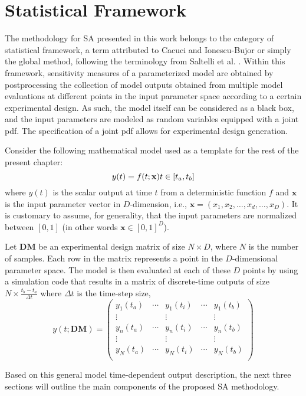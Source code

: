 \section{Statistical Framework}\label{sec:sa_statistical_framework}

The methodology for SA presented in this work belongs to
the category of statistical framework, a term attributed
to Cacuci and Ionescu-Bujor \cite{Ionescu-Bujor2004} or simply the global
method, following the terminology from Saltelli et al. \cite{Saltelli2004}.
Within this framework, sensitivity measures of a parameterized
model are obtained by postprocessing the collection
of model outputs obtained from multiple model
evaluations at different points in the input parameter space
according to a certain experimental design. 
As such, the model itself can be considered as a black box, 
and the input parameters are modeled as random variables
equipped with a joint pdf. 
The specification of a joint pdf allows for experimental design generation.

Consider the following mathematical model used as a template for the rest of the present chapter:
\begin{equation}
y(t) = f(t;\mathbf{x}) \bigskip t \in [t_a,t_b]
\end{equation}
where $y(t)$ is the scalar output at time $t$ from a deterministic
function $f$ and $\mathbf{x}$ is the input parameter vector in
$D$-dimension, i.e., $\mathbf{x} = (x_1, x_2, \dots , x_d, \dots , x_D)$.
It is customary to assume, for generality, that the input parameters are normalized between $[0,1]$ (in other words $\mathbf{x} \in [0,1]^D$).

Let $\mathbf{DM}$ be an experimental design matrix of size
$N \times D$, where $N$ is the number of samples. 
Each row in the matrix represents a point in the $D$-dimensional parameter space. 
The model is then evaluated at each of these $D$ points by using a simulation code that results in a matrix of discrete-time outputs of size $N\times \frac{t_b-t_a}{\Delta t}$ where $\Delta t$ is the time-step size,
\begin{equation}
y(t; \mathbf{DM}) = 
\begin{pmatrix}
y_1(t_a)  & \cdots & y_1(t_i) & \cdots & y_1(t_b)\\
\vdots	  &        & \vdots   &        & \vdots\\
y_n(t_a)  & \cdots & y_n(t_i) & \cdots & y_n(t_b)\\
\vdots	  &        & \vdots   &        & \vdots\\
y_N(t_a)  & \cdots & y_N(t_i) & \cdots & y_N(t_b) \\
\end{pmatrix}
\label{eq:discrete_time}
\end{equation}

Based on this general model time-dependent output description, 
the next three sections will outline the main components of the proposed SA methodology.
